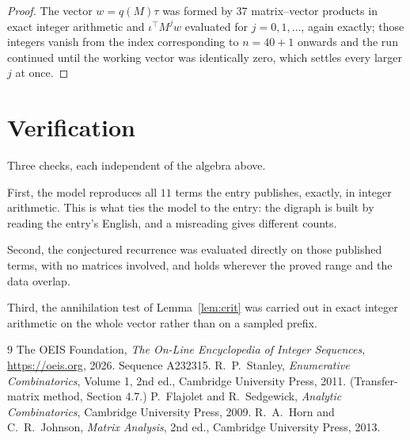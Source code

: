 \documentclass[11pt,a4paper]{article}
\theoremstyle{plain}
\theoremstyle{definition}
\begin{document}
\begin{proof}
The vector $w=q(M)\tau$ was formed by $37$ matrix--vector products in exact integer
arithmetic and $\iota^{\!\top}M^{j}w$ evaluated for $j=0,1,\dots$, again exactly; those
integers vanish from the index corresponding to $n=40+1$ onwards and the run continued
until the working vector was identically zero, which settles every larger $j$ at once.
\end{proof}

\section{Verification}

Three checks, each independent of the algebra above.

First, the model reproduces all $11$ terms the entry publishes, exactly, in integer
arithmetic. This is what ties the model to the entry: the digraph is built by reading the
entry's English, and a misreading gives different counts.

Second, the conjectured recurrence was evaluated directly on those published terms, with no
matrices involved, and holds wherever the proved range and the data overlap.

Third, the annihilation test of Lemma~\ref{lem:crit} was carried out in exact integer
arithmetic on the whole vector rather than on a sampled prefix.

\begin{thebibliography}{9}
 The OEIS Foundation, \emph{The On-Line Encyclopedia of Integer
Sequences}, \url{https://oeis.org}, 2026. Sequence A232315.
 R.~P.~Stanley, \emph{Enumerative Combinatorics}, Volume 1, 2nd ed.,
Cambridge University Press, 2011. (Transfer-matrix method, Section 4.7.)
 P.~Flajolet and R.~Sedgewick, \emph{Analytic Combinatorics}, Cambridge
University Press, 2009.
 R.~A.~Horn and C.~R.~Johnson, \emph{Matrix Analysis}, 2nd ed., Cambridge
University Press, 2013.
\end{thebibliography}
\end{document}

